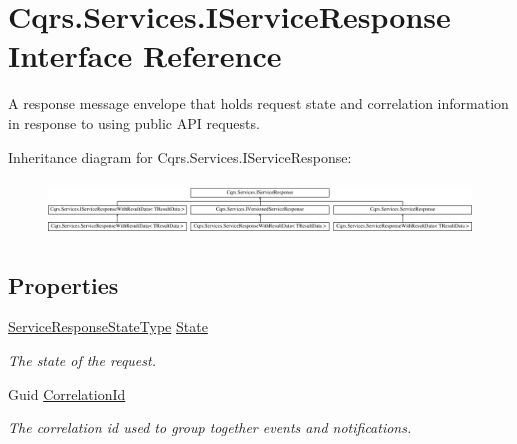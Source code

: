 \hypertarget{interfaceCqrs_1_1Services_1_1IServiceResponse}{}\section{Cqrs.\+Services.\+I\+Service\+Response Interface Reference}
\label{interfaceCqrs_1_1Services_1_1IServiceResponse}


A response message envelope that holds request state and correlation information in response to using public A\+PI requests.  


Inheritance diagram for Cqrs.\+Services.\+I\+Service\+Response\+:\begin{figure}[H]
\begin{center}
\leavevmode
\includegraphics[height=1.469816cm]{interfaceCqrs_1_1Services_1_1IServiceResponse}
\end{center}
\end{figure}
\subsection*{Properties}
\begin{DoxyCompactItemize}
\item 
\hyperlink{namespaceCqrs_1_1Services_a41411b784c4fcb7eed0cef2a5b522de0}{Service\+Response\+State\+Type} \hyperlink{interfaceCqrs_1_1Services_1_1IServiceResponse_a946aa90e8fcd82481944c571baaebb2e}{State}
\begin{DoxyCompactList}\small\item\em The state of the request. \end{DoxyCompactList}\item 
Guid \hyperlink{interfaceCqrs_1_1Services_1_1IServiceResponse_a5f6a02ee73059558e9859d7e5fe06025}{Correlation\+Id}
\begin{DoxyCompactList}\small\item\em The correlation id used to group together events and notifications. \end{DoxyCompactList}\end{DoxyCompactItemize}


